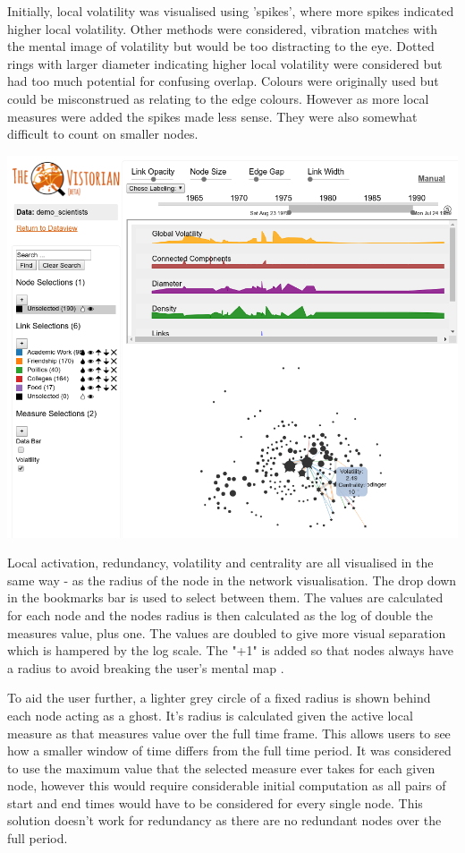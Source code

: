 Initially, local volatility was visualised using 'spikes', where more spikes indicated higher local volatility. Other methods were considered, vibration matches with the mental image of volatility but would be too distracting to the eye. Dotted rings with larger diameter indicating higher local volatility were considered but had too much potential for confusing overlap. Colours were originally used but could be misconstrued as relating to the edge colours. 
However as more local measures were added the spikes made less sense. They were also somewhat difficult to count on smaller nodes.

\begin{center}
\includegraphics[trim={9cm, 0, 0, 14cm}, clip, width=140mm]{./Figures/finalUI.png}
\end{center}

Local activation, redundancy, volatility and centrality are all visualised in the same way - as the radius of the node in the network visualisation. The drop down in the bookmarks bar is used to select between them. The values are calculated for each node and the nodes radius is then calculated as the log of double the measures value, plus one. The values are doubled to give more visual separation which is hampered by the log scale. The "+1" is added so that nodes always have a radius to avoid breaking the user's mental map \cite{BLANK}.

To aid the user further, a lighter grey circle of a fixed radius is shown behind each node acting as a ghost. It's radius is calculated given the active local measure as that measures value over the full time frame. This allows users to see how a smaller window of time differs from the full time period. It was considered to use the maximum value that the selected measure ever takes for each given node, however this would require considerable initial computation as all pairs of start and end times would have to be considered for every single node. This solution doesn't work for redundancy as there are no redundant nodes over the full period.


